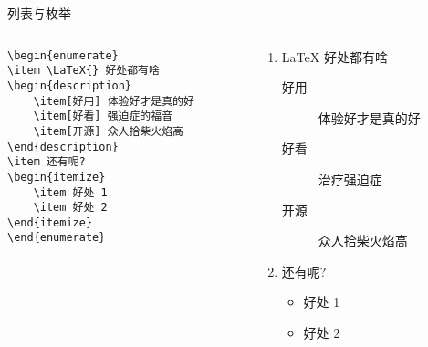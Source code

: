 \begin{frame}[fragile]{列表与枚举}
\begin{columns}
\begin{column}{.6\textwidth}
\begin{lstlisting}[basicstyle=\ttfamily\small]
\begin{enumerate}
\item \LaTeX{} 好处都有啥
\begin{description}
    \item[好用] 体验好才是真的好
    \item[好看] 强迫症的福音
    \item[开源] 众人拾柴火焰高
\end{description}
\item 还有呢?
\begin{itemize}
    \item 好处 1
    \item 好处 2
\end{itemize}
\end{enumerate}
\end{lstlisting}
\end{column}
\begin{column}{.4\textwidth}
{\small
\begin{enumerate}
\item \LaTeX{} 好处都有啥
    \begin{description}
    \item[好用] 体验好才是真的好
    \item[好看] 治疗强迫症
    \item[开源] 众人拾柴火焰高
    \end{description}
\item 还有呢?
    \begin{itemize}
    \item 好处 1
    \item 好处 2
    \end{itemize}
\end{enumerate}
}
\end{column}
\end{columns}

\end{frame}

